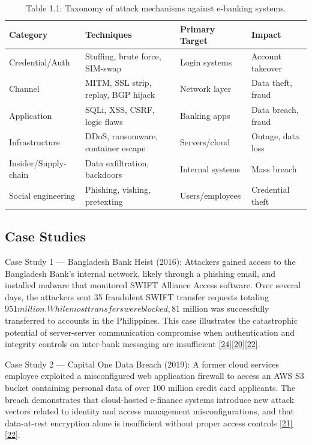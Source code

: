 \begin{table}[htbp]
\centering
\begin{tabular}{llll}
\toprule
Category & Techniques & Primary Target & Impact \\
\midrule
Credential/Auth & Stuffing, brute force, SIM-swap & Login systems & Account takeover \\
Channel & MITM, SSL strip, replay, BGP hijack & Network layer & Data theft, fraud \\
Application & SQLi, XSS, CSRF, logic flaws & Banking apps & Data breach, fraud \\
Infrastructure & DDoS, ransomware, container escape & Servers/cloud & Outage, data loss \\
Insider/Supply-chain & Data exfiltration, backdoors & Internal systems & Mass breach \\
Social engineering & Phishing, vishing, pretexting & Users/employees & Credential theft \\
\bottomrule
\end{tabular}
\caption{Table 1.1: Taxonomy of attack mechanisms against e-banking systems.}\label{tbl:1.1}
\end{table}
\subsection{Case Studies}

\indent Case Study 1 --- Bangladesh Bank Heist (2016): Attackers gained access to the Bangladesh Bank's internal network, likely through a phishing email, and installed malware that monitored SWIFT Alliance Access software. Over several days, the attackers sent 35 fraudulent SWIFT transfer requests totaling $951 million. While most transfers were blocked, $81 million was successfully transferred to accounts in the Philippines. This case illustrates the catastrophic potential of server-server communication compromise when authentication and integrity controls on inter-bank messaging are insufficient \hyperref[ref:24]{[24]}\hyperref[ref:20]{[20]}\hyperref[ref:22]{[22]}.

\indent Case Study 2 --- Capital One Data Breach (2019): A former cloud services employee exploited a misconfigured web application firewall to access an AWS S3 bucket containing personal data of over 100 million credit card applicants. The breach demonstrates that cloud-hosted e-finance systems introduce new attack vectors related to identity and access management misconfigurations, and that data-at-rest encryption alone is insufficient without proper access controls \hyperref[ref:21]{[21]}\hyperref[ref:22]{[22]}.

